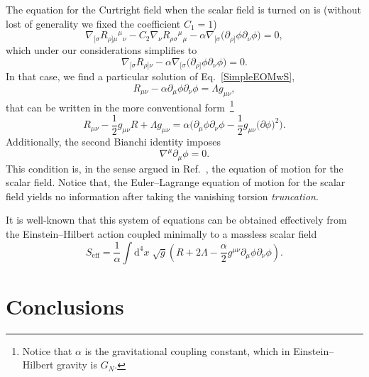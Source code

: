 \documentclass[aps,prd,12pt,twocolumn,superscriptaddress,showpacs,showkeys,reprint,longbibliography]{revtex4-1}
\newcommand\pa[1]{\partial_{{#1}}}
\renewcommand{\(}{\left(}
\renewcommand{\)}{\right)}
\renewcommand{\[}{\left[}
\renewcommand{\]}{\right]}
\newcommand{\dn}[2]{{\mathrm{d}}^{#1}{#2}\;}
\newcommand{\hl}[1]{{\color{red} \bfseries{#1}}}
\begin{document}
The equation for the Curtright field when the scalar field is turned on is (without lost of generality we fixed the coefficient $C_1 = 1$)
\begin{equation*}
  \nabla_{[\sigma} R_{\rho]\mu}{}^{\mu}{}_\nu - {C_2} \nabla_\nu  R_{\rho\sigma}{}^{\mu}{}_\mu - \alpha \nabla_{[\sigma} \Big( \partial_{\rho]}\phi \partial_\nu\phi \Big) = 0,
\end{equation*}
which under our considerations simplifies to 
\begin{equation}
  \nabla_{[\sigma} R_{\rho]\nu} - \alpha \nabla_{[\sigma} \Big( \partial_{\rho]}\phi \partial_\nu\phi \Big) = 0.
  \label{SimpleEOMwS}
\end{equation}
In that case, we find a particular solution of Eq.~\eqref{SimpleEOMwS},%
\begin{equation*}
  R_{\mu\nu} - \alpha \pa{\mu} \phi \pa{\nu} \phi = \Lambda g_{\mu\nu},
\end{equation*}
that can be written in the more conventional form~\footnote{Notice that $\alpha$ is the gravitational coupling constant, which in Einstein--Hilbert gravity is $G_N$.}
\begin{equation}
  R_{\mu\nu} - \frac{1}{2} g_{\mu\nu} R + \Lambda g_{\mu\nu} = \alpha \Big( \pa{\mu} \phi \pa{\nu} \phi - \frac{1}{2} g_{\mu\nu} \big( \partial\phi \big)^2 \Big).
\end{equation}
Additionally, the second Bianchi identity imposes
\begin{equation}
  \nabla^\mu \pa{\mu} \phi = 0.
\end{equation}
This condition is, in the sense argued in Ref.~\cite{Bekenstein:2014uwa}, the equation of motion for the scalar field. Notice that, the Euler--Lagrange equation of motion for the scalar field yields no information after taking the vanishing torsion \emph{truncation}.

It is well-known that this system of equations can be obtained effectively from the Einstein--Hilbert action coupled minimally to a massless scalar field
\begin{equation}
  S_{\text{eff}} = \frac{1}{\alpha} \int \dn{4}{x} \sqrt{g} \left( R + 2 \Lambda - \frac{\alpha}{2} g^{\mu\nu} \pa{\mu}\phi \pa{\nu} \phi \right).
\end{equation}

\section{\label{conclusions}Conclusions}
\end{document}
